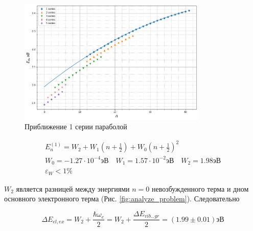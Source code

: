 \documentclass[11.5pt,a4paper,russian]{article}
\begin{document}
\begin{figure}[h!]
  \centering
  \includegraphics[width=0.8\textwidth]{6ff35e60-3113-41e5-823f-6d8197fa322a}  \caption{Приближение 1 серии параболой}
  \label{fig:fit_parabola}
\end{figure}

\begin{gather*}
E^{(1)}_n = W_2 + W_1 \left(n+\frac12 \right) + W_0 \left(n+\frac12 \right)^2 \\
W_0 = -1.27 \cdot 10^{-4} \text{эВ} \quad W_1 = 1.57 \cdot 10^{-2} \text{эВ} \quad W_2 = 1.98 \text{эВ} \\
\varepsilon_W < 1 \%
\end{gather*}

$W_2$ является разницей между энергиями $n=0$ невозбужденного терма и дном основного электронного терма (Рис. \ref{fig:analyze_problem}). Следовательно

$$
\Delta E_{el, ex} = W_2 + \frac{\hbar \omega_e}{2} = W_2 + \frac{\Delta E_{v i b ., g r}}2 = (1.99 \pm 0.01) \text{эВ}
$$
\end{document}
